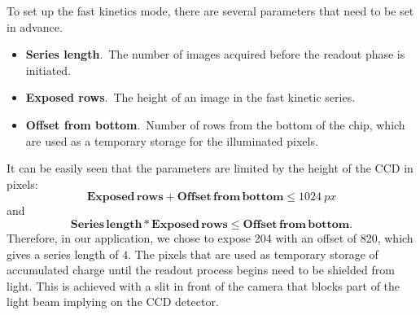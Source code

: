 
To set up the fast kinetics mode, there are several parameters that need to be set in advance.
\begin{itemize}
	\item \textbf{Series length}.\, The number of images acquired before the readout phase is initiated.
	\item \textbf{Exposed rows}.\, The height of an image in the fast kinetic series.
	\item \textbf{Offset from bottom}.\, Number of rows from the bottom of the chip, which are used as a temporary storage for the illuminated pixels.
\end{itemize}

It can be easily seen that the parameters are limited by the height of the CCD in pixels:
\begin{equation}
\mathbf{Exposed\,rows} + \mathbf{Offset\,from\,bottom} \leq \SI{1024}{px}
\end{equation}
and
\begin{equation}
\mathbf{Series\,length}*\mathbf{Exposed\,rows} \leq \mathbf{Offset\,from\,bottom}.
\end{equation}
Therefore, in our application, we chose to expose \SI{204}{\px} with an offset of \SI{820}{\px}, which gives a series length of $4$.
The pixels that are used as temporary storage of accumulated charge until the readout process begins need to be shielded from light. This is achieved with a slit in front of the camera that blocks part of the light beam implying on the CCD detector.

